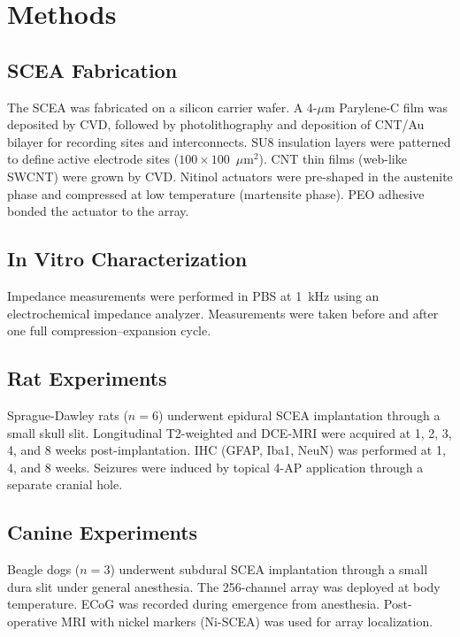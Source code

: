 \documentclass[11pt]{article}
\begin{document}
\section{Methods}

\subsection{SCEA Fabrication}

The SCEA was fabricated on a silicon carrier wafer. A 4-$\mu$m Parylene-C film was deposited by CVD, followed by photolithography and deposition of CNT/Au bilayer for recording sites and interconnects. SU8 insulation layers were patterned to define active electrode sites ($100 \times 100$~$\mu$m$^2$). CNT thin films (web-like SWCNT) were grown by CVD. Nitinol actuators were pre-shaped in the austenite phase and compressed at low temperature (martensite phase). PEO adhesive bonded the actuator to the array.

\subsection{In Vitro Characterization}

Impedance measurements were performed in PBS at 1~kHz using an electrochemical impedance analyzer. Measurements were taken before and after one full compression--expansion cycle.

\subsection{Rat Experiments}

Sprague-Dawley rats ($n = 6$) underwent epidural SCEA implantation through a small skull slit. Longitudinal T2-weighted and DCE-MRI were acquired at 1, 2, 3, 4, and 8 weeks post-implantation. IHC (GFAP, Iba1, NeuN) was performed at 1, 4, and 8 weeks. Seizures were induced by topical 4-AP application through a separate cranial hole.

\subsection{Canine Experiments}

Beagle dogs ($n = 3$) underwent subdural SCEA implantation through a small dura slit under general anesthesia. The 256-channel array was deployed at body temperature. ECoG was recorded during emergence from anesthesia. Post-operative MRI with nickel markers (Ni-SCEA) was used for array localization.
\end{document}
